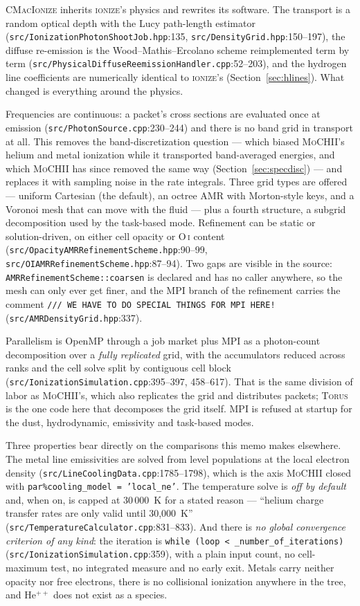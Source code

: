 \documentclass[english,a4paper]{my_memo}
\newcommand{\code}[1]{\texttt{#1}}
\newcommand{\MoCHII}{\textsc{MoCHII}}
\newcommand{\Wood}{\textsc{ionize}}
\newcommand{\CMI}{\textsc{CMacIonize}}
\newcommand{\Torus}{\textsc{Torus}}
\begin{document}
\CMI{} inherits \Wood{}'s physics and rewrites its software.  The transport
is a random optical depth with the Lucy path-length estimator
(\code{src/IonizationPhotonShootJob.hpp}:135,
\code{src/DensityGrid.hpp}:150--197), the diffuse re-emission is the
Wood--Mathis--Ercolano scheme reimplemented term by term
(\code{src/PhysicalDiffuse\-Reemission\-Handler.cpp}:52--203), and the
hydrogen
line coefficients are numerically identical to \Wood{}'s
(Section~\ref{sec:hlines}).  What changed is everything around the physics.

Frequencies are continuous: a packet's cross sections are evaluated once at
emission (\code{src/PhotonSource.cpp}:230--244) and there is no band grid in
transport at all.  This removes the band-discretization question --- which
biased \MoCHII{}'s helium and metal ionization while it transported
band-averaged energies, and which \MoCHII{} has since removed the same way
(Section~\ref{sec:specdisc}) --- and replaces it with sampling noise in the
rate integrals.  Three grid types are offered --- uniform Cartesian (the
default), an octree AMR with Morton-style keys, and a Voronoi mesh that can
move with the fluid --- plus a fourth structure, a subgrid decomposition used
by the task-based mode.  Refinement can be static or solution-driven, on
either cell opacity or O\,\textsc{i} content
(\code{src/OpacityAMRRefinementScheme.hpp}:90--99,
\code{src/OIAMRRefinementScheme.hpp}:87--94).  Two gaps are visible in the
source: \code{AMRRefinementScheme::coarsen} is declared and
has no caller anywhere, so the mesh can only ever get finer, and the MPI
branch of the refinement carries the comment \code{///~WE HAVE TO DO SPECIAL
THINGS FOR MPI HERE!} (\code{src/AMRDensityGrid.hpp}:337).

Parallelism is OpenMP through a job market plus MPI as a photon-count
decomposition over a \emph{fully replicated} grid, with the accumulators
reduced across ranks and the cell solve split by contiguous cell block
(\code{src/IonizationSimulation.cpp}:395--397, 458--617).  That is the same
division of labor as \MoCHII{}'s, which also replicates the grid and
distributes packets; \Torus{} is the one code here that decomposes the grid
itself.  MPI is refused at startup for the dust, hydrodynamic,
emissivity and task-based modes.

Three properties bear directly on the comparisons this memo makes elsewhere.
The metal line emissivities are solved from level populations at the local
electron density (\code{src/LineCoolingData.cpp}:1785--1798), which is the
axis \MoCHII{} closed with \code{par\%cooling\_model = 'local\_ne'}.  The
temperature solve is \emph{off by default} and, when on, is capped at
30\,000~K for a stated reason --- ``helium charge transfer rates are only
valid until 30,000~K'' (\code{src/TemperatureCalculator.cpp}:831--833).  And
there is \emph{no global convergence criterion of any kind}: the iteration is
\code{while (loop < \_number\_of\_iterations)}
(\code{src/IonizationSimulation.cpp}:359), with a plain input count, no
cell-maximum test, no integrated measure and no early exit.  Metals carry
neither opacity nor free electrons, there is no collisional ionization
anywhere in the tree, and He$^{++}$ does not exist as a species.
\end{document}
